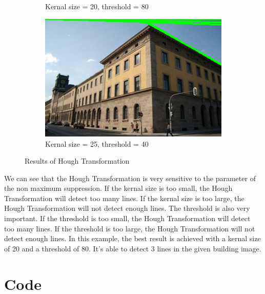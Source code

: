 \documentclass[12pt
,headinclude
,headsepline
,bibtotocnumbered
]{scrartcl}
\begin{document}
\begin{figure}[H]
\begin{subfigure}{0.45\textwidth}
        \caption*{Kernal size = 20, threshold = 80}
    \end{subfigure}
    \hfill
    \begin{subfigure}{0.45\textwidth}
        \includegraphics[width=1\textwidth]{plots/houghlines_25_40.png}
        \caption*{Kernal size = 25, threshold = 40}
    \end{subfigure}
    \caption{Results of Hough Transformation}
    \label{fig:5}
\end{figure}
We can see that the Hough Transformation is very sensitive to the parameter of the non maximum suppression. If the kernal size is too small, the Hough Transformation will detect too many lines. If the kernal size is too large, the Hough Transformation will not detect enough lines. The threshold is also very important. If the threshold is too small, the Hough Transformation will detect too many lines. If the threshold is too large, the Hough Transformation will not detect enough lines. In this example, the best result is achieved with a kernal size of 20 and a threshold of 80. It's able to detect 3 lines in the given building image. 
\newpage
\section*{Code}



\end{document}
